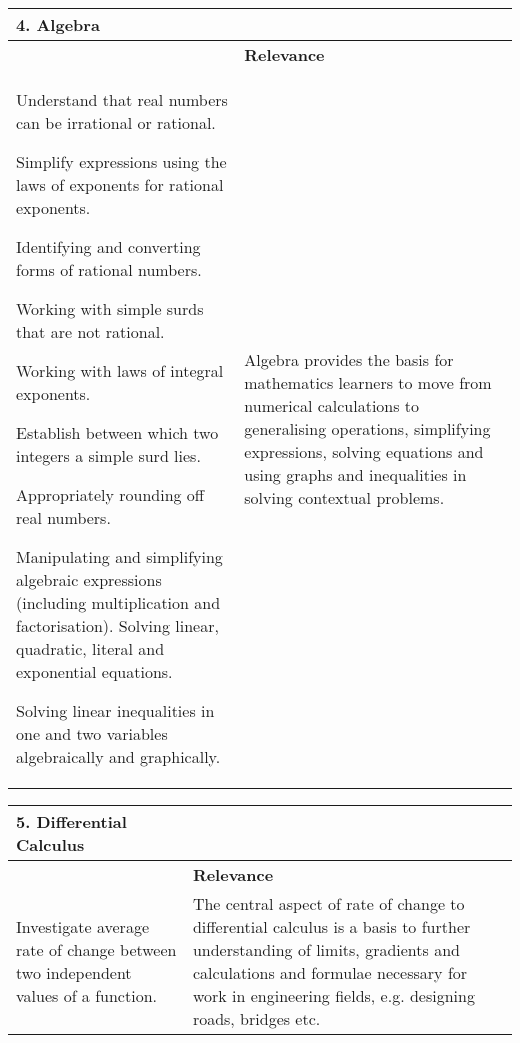 \begin{table}[H]
\begin{center} 
\begin{tabular}{|p{8.5cm}|p{3.5cm}|} \hline
\textbf{4. Algebra}& \\ \hline  
&  \textbf{Relevance} \\ \hline
Understand that real numbers can be irrational or rational. \par
Simplify expressions using the laws of exponents for rational exponents.\par
Identifying and converting forms of rational numbers.\par
Working with simple surds that are not rational.\par
Working with laws of integral exponents.\par
Establish between which two integers a simple surd lies.\par
Appropriately rounding off real numbers.\par
Manipulating and simplifying algebraic expressions (including multiplication and factorisation).
Solving linear, quadratic, literal and exponential equations.\par
Solving linear inequalities in one and two variables algebraically and graphically.& Algebra provides the basis for mathematics learners to move from numerical calculations to generalising operations, simplifying expressions, solving equations and using graphs and inequalities in solving contextual problems.
\\ \hline

 \end{tabular}
\end{center}
\end{table}

\begin{table}[H]
 \begin{center} 
\begin{tabular}{|p{8.5cm}|p{3.5cm}|} \hline
\textbf{5. Differential Calculus}& \\ \hline  
&  \textbf{Relevance} \\ \hline
Investigate average rate of change between two independent values of a function.& The central aspect of rate of change to differential calculus is a basis to further understanding of limits, gradients and calculations and formulae necessary for work in engineering fields, e.g. designing roads, bridges etc. 
\\ \hline

 \end{tabular}
\end{center}
\end{table}

